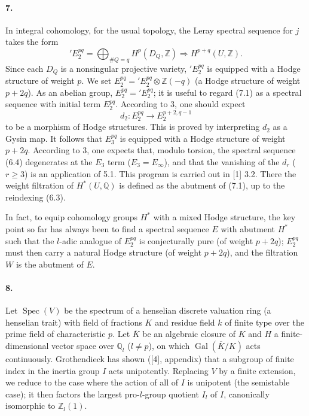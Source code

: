 \documentclass[10pt]{article}
\newcommand{\Q}{\mathbb Q}
\newcommand{\Z}{\mathbb Z}
\newcommand{\Gal}{\operatorname{Gal}}
\newcommand{\Spec}{\operatorname{Spec}}
\newcommand{\barK}{\overline{K}}
\begin{document}
\paragraph{7.} In integral cohomology, for the usual topology, the Leray spectral sequence for $j$ takes the form
\[
\tag{7.1}
{}'E_2^{pq}=\bigoplus_{\#Q=q}H^p(D_Q,\Z)\Rightarrow H^{p+q}(U,\Z).
\]
Since each $D_Q$ is a nonsingular projective variety, ${}'E_2^{pq}$ is equipped with a Hodge structure of weight $p$. We set $E_2^{pq}={}'E_2^{pq}\otimes\Z(-q)$ (a Hodge structure of weight $p+2q$). As an abelian group, $E_2^{pq}={}'E_2^{pq}$; it is useful to regard (7.1) as a spectral sequence with initial term $E_2^{pq}$. According to 3, one should expect
\[
d_2:E_2^{pq}\to E_2^{p+2,q-1}
\]
to be a morphism of Hodge structures. This is proved by interpreting $d_2$ as a Gysin map. It follows that $E_3^{pq}$ is equipped with a Hodge structure of weight $p+2q$. According to 3, one expects that, modulo torsion, the spectral sequence (6.4) %
degenerates at the $E_3$ term ($E_3=E_\infty$), and that the vanishing of the $d_r$ ($r\ge3$) is an application of 5.1. This program is carried out in [1] 3.2. There the weight filtration of $H^*(U,\Q)$ is defined as the abutment of (7.1), up to the reindexing (6.3).

In fact, to equip cohomology groups $H^*$ with a mixed Hodge structure, the key point so far has always been to find a spectral sequence $E$ with abutment $H^*$ such that the $l$-adic analogue of $E_2^{pq}$ is conjecturally pure (of weight $p+2q$); $E_2^{pq}$ must then carry a natural Hodge structure (of weight $p+2q$), and the filtration $W$ is the abutment of $E$.

\paragraph{8.} Let $\Spec(V)$ be the spectrum of a henselian discrete valuation ring (a henselian trait) with field of fractions $K$ and residue field $k$ of finite type over the prime field of characteristic $p$. Let $\barK$ be an algebraic closure of $K$ and $H$ a finite-dimensional vector space over $\Q_l$ ($l\ne p$), on which $\Gal(\barK/K)$ acts continuously. Grothendieck has shown ([4], appendix) that a subgroup of finite index in the inertia group $I$ acts unipotently. Replacing $V$ by a finite extension, we reduce to the case where the action of all of $I$ is unipotent (the semistable case); it then factors the largest pro-$l$-group quotient $I_l$ of $I$, canonically isomorphic to $\Z_l(1)$. %
\end{document}
